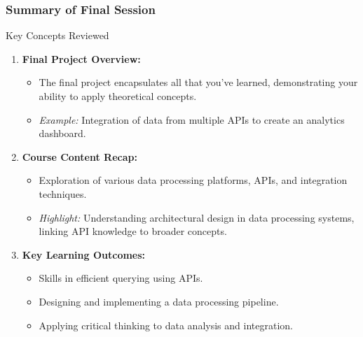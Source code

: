 \documentclass[aspectratio=169]{beamer}
\begin{document}
\begin{frame}[fragile]
    \frametitle{Summary of Final Session}
    \begin{block}{Key Concepts Reviewed}
        \begin{enumerate}
            \item \textbf{Final Project Overview:}
                \begin{itemize}
                    \item The final project encapsulates all that you’ve learned, demonstrating your ability to apply theoretical concepts.
                    \item \textit{Example:} Integration of data from multiple APIs to create an analytics dashboard.
                \end{itemize}

            \item \textbf{Course Content Recap:}
                \begin{itemize}
                    \item Exploration of various data processing platforms, APIs, and integration techniques.
                    \item \textit{Highlight:} Understanding architectural design in data processing systems, linking API knowledge to broader concepts.
                \end{itemize}

            \item \textbf{Key Learning Outcomes:}
                \begin{itemize}
                    \item Skills in efficient querying using APIs.
                    \item Designing and implementing a data processing pipeline.
                    \item Applying critical thinking to data analysis and integration.
                \end{itemize}
        \end{enumerate}
    \end{block}
\end{frame}
\end{document}
